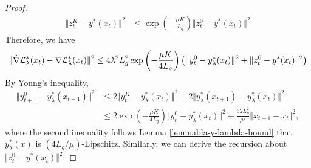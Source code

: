 \begin{proof}
\begin{align*}
     \Vert z_t^K - y^*(x_t) \Vert^2 &\le \exp\left( - \frac{\mu K}{L_g} \right) \Vert z_t^0 - y^*(x_t) \Vert^2
\end{align*}
Therefore, we have
\begin{align} \label{eq:err}
    \Vert \hat \nabla {\mathcal{L}}_{\lambda}^*(x_t)- \nabla {\mathcal{L}}_{\lambda}^*(x_t) \Vert^2 \le 4 \lambda^2 L_g^2 \exp\left( - \frac{\mu K}{4 L_g} \right) \left( \Vert y_t^0 - y_{\lambda}^*(x_t) \Vert^2 + \Vert z_t^0 - y^*(x_t) \Vert^2 \right)
\end{align}
By Young's inequality, 
\begin{align*}
    \Vert y_{t+1}^0 - y_{\lambda}^*(x_{t+1}) \Vert^2 & \le 2 \Vert y_t^K - y_{\lambda}^*(x_{t}) \Vert^2 + 2 \Vert y_{\lambda}^*(x_{t+1}) - y_{\lambda}^*(x_t) \Vert^2  \\
    &\le 2 \exp \left( - \frac{\mu K}{4 L_g} \right) \Vert y_t^0 - y_{\lambda}^*(x_t) \Vert^2 + \frac{32 L_g^2}{\mu^2} \Vert x_{t+1} - x_t \Vert^2,
\end{align*}
where the second inequality follows Lemma \ref{lem:nabla-y-lambda-bound} that $y_{\lambda}^*(x)$ is $(4 L_g/\mu)$-Lipschitz.  Similarly, we can derive the recursion about $\Vert z_t^0 - y^*(x_t) \Vert^2$. 


\end{proof}
